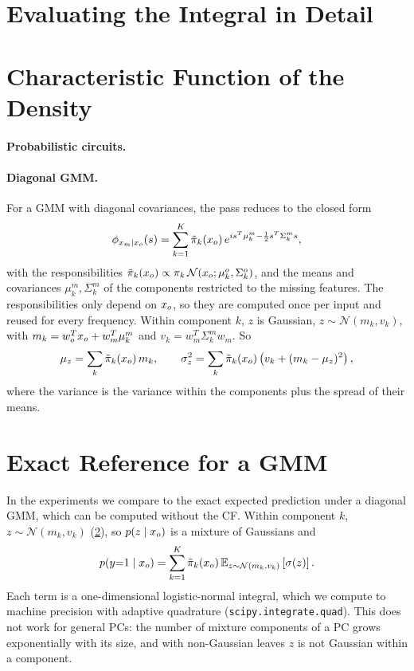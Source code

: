 \section{Evaluating the Integral in Detail}
\label{app:integral}

\section{Characteristic Function of the Density}
\label{app:density}

\paragraph{Probabilistic circuits.}

\paragraph{Diagonal GMM.}
For a GMM with diagonal covariances, the pass reduces to the closed form
\[
  \phi_{x_m \mid x_o}(s) = \sum_{k=1}^{K} \tilde{\pi}_k(x_o)\, e^{i s^T \mu_k^m - \frac{1}{2} s^T \Sigma_k^m s},
\]
with the responsibilities $\tilde{\pi}_k(x_o) \propto \pi_k\, \mathcal{N}(x_o; \mu_k^o, \Sigma_k^o)$, and the means and covariances $\mu_k^m, \Sigma_k^m$ of the components restricted to the missing features.
The responsibilities only depend on $x_o$, so they are computed once per input and reused for every frequency.
Within component $k$, $z$ is Gaussian, $z \sim \mathcal{N}(m_k, v_k)$, with $m_k = w_o^T x_o + w_m^T \mu_k^m$ and $v_k = w_m^T \Sigma_k^m w_m$. So
\[
  \mu_z = \sum_k \tilde{\pi}_k(x_o)\, m_k, \qquad \sigma_z^2 = \sum_k \tilde{\pi}_k(x_o) \left( v_k + (m_k - \mu_z)^2 \right),
\]
where the variance is the variance within the components plus the spread of their means.

\section{Exact Reference for a GMM}
\label{app:gmm-reference}

In the experiments we compare to the exact expected prediction under a diagonal GMM, which can be computed without the CF.
Within component $k$, $z \sim \mathcal{N}(m_k, v_k)$ (\cref{app:density}), so $p(z \mid x_o)$ is a mixture of Gaussians and
\[
  p(y{=}1 \mid x_o) = \sum_{k=1}^{K} \tilde{\pi}_k(x_o)\, \mathbb{E}_{z \sim \mathcal{N}(m_k, v_k)} \left[ \sigma(z) \right].
\]
Each term is a one-dimensional logistic-normal integral, which we compute to machine precision with adaptive quadrature (\texttt{scipy.integrate.quad}).
This does not work for general PCs: the number of mixture components of a PC grows exponentially with its size, and with non-Gaussian leaves $z$ is not Gaussian within a component.

